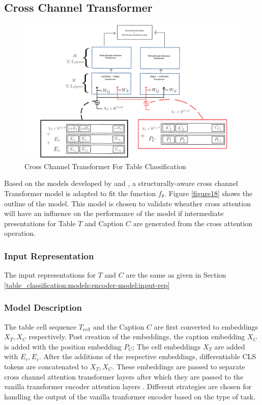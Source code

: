 \subsection{Cross Channel Transformer}
\label{table_classification:models:cross-channel}
\begin{figure}[h]
    \centering
    \includegraphics[width=\maxwidth{\textwidth}]{src/images/tablemodel.pdf}
    \caption{Cross Channel Transformer For Table Classification}
    \label{figure\arabic{figurecounter}}
\end{figure}

Based on the models developed by \cite{tsai2019multimodal} and \cite{deng2020turl}, a structurally-aware cross channel Transformer model is adapted to fit the function $f_\theta$. Figure \ref{figure18} shows the outline of the model. This model is chosen to validate wheather cross attention will have an influence on the performance of the model if intermediate presentations for Table $T$ and Caption $C$ are generated from the cross attention operation. 

\subsubsection{Input Representation}
The input representations for $T$ and $C$ are the same as given in Section \ref{table_classification:models:encoder-model:input-rep}


\subsubsection{Model Description}
The table cell sequence $T_{cell}$ and the Caption $C$ are first converted to embeddings $X_T, X_C$ respectively. Post creation of the embeddings,  the caption embedding  $X_C$ is added with the position embedding $P_C$; The cell embeddings $X_T$ are added with $E_r,E_c$. After the additions of the respective embeddings, differentiable CLS tokens are concatenated to $X_T,X_C$.
These embeddings are passed to separate cross channel attention transformer layers \parencite{tsai2019multimodal} after which they are passed to the vanilla transformer encoder attention layers \parencite{vaswani2017attention}. Different strategies are chosen for handling the output of the vanilla tranformer encoder based on the type of task. 


